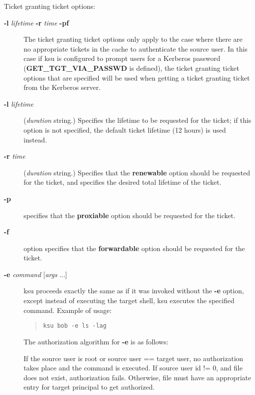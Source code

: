 \documentclass[letterpaper,10pt,english]{sphinxmanual}
\begin{document}
Ticket granting ticket options:
\begin{description}
\item[{\textbf{-l} \emph{lifetime} \textbf{-r} \emph{time} \textbf{-pf}}] \leavevmode
The ticket granting ticket options only apply to the case where
there are no appropriate tickets in the cache to authenticate the
source user.  In this case if ksu is configured to prompt users
for a Kerberos password (\textbf{GET\_TGT\_VIA\_PASSWD} is defined), the
ticket granting ticket options that are specified will be used
when getting a ticket granting ticket from the Kerberos server.

\item[{\textbf{-l} \emph{lifetime}}] \leavevmode
(\emph{duration} string.)  Specifies the lifetime to be requested
for the ticket; if this option is not specified, the default ticket
lifetime (12 hours) is used instead.

\item[{\textbf{-r} \emph{time}}] \leavevmode
(\emph{duration} string.)  Specifies that the \textbf{renewable} option
should be requested for the ticket, and specifies the desired
total lifetime of the ticket.

\item[{\textbf{-p}}] \leavevmode
specifies that the \textbf{proxiable} option should be requested for
the ticket.

\item[{\textbf{-f}}] \leavevmode
option specifies that the \textbf{forwardable} option should be
requested for the ticket.

\item[{\textbf{-e} \emph{command} {[}\emph{args} ...{]}}] \leavevmode
ksu proceeds exactly the same as if it was invoked without the
\textbf{-e} option, except instead of executing the target shell, ksu
executes the specified command. Example of usage:
\begin{quote}

\begin{Verbatim}[commandchars=\\\{\}]
ksu bob -e ls -lag
\end{Verbatim}
\end{quote}

The authorization algorithm for \textbf{-e} is as follows:

If the source user is root or source user == target user, no
authorization takes place and the command is executed.  If source
user id != 0, and  file does not exist,
authorization fails.  Otherwise,  file
must have an appropriate entry for target principal to get
authorized.


\end{description}
\end{document}
